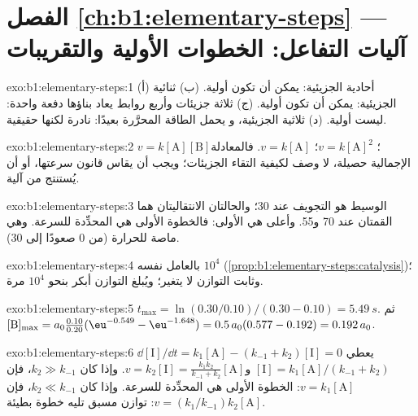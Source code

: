 \section*{الفصل \ref{ch:b1:elementary-steps} --- آليات التفاعل: الخطوات الأولية والتقريبات}

\begin{solution}{exo:b1:elementary-steps:1}
(أ) أحادية الجزيئية: يمكن أن تكون أولية. (ب) ثنائية الجزيئية: يمكن أن تكون أولية.
(ج) ثلاثة جزيئات وأربع روابط يعاد بناؤها دفعة واحدة: ليست أولية.
(د) ثلاثية الجزيئية، و يحمل الطاقة المحرَّرة بعيدًا: 
نادرة لكنها حقيقية.
\end{solution}

\begin{solution}{exo:b1:elementary-steps:2}
$v = k[\mathrm{A}][\mathrm{B}]$؛ $v = k[\mathrm{A}]^2$؛ $v = k[\mathrm{A}]$.
فالمعادلة الإجمالية حصيلة، لا وصف لكيفية التقاء
الجزيئات؛ ويجب أن يقاس قانون سرعتها، أو أن يُستنتج من
آلية.
\end{solution}

\begin{solution}{exo:b1:elementary-steps:3}
الوسيط هو التجويف عند 30؛ والحالتان الانتقاليتان هما
القمتان عند 70 و55. وأعلى  هي الأولى: فالخطوة
الأولى هي المحدِّدة للسرعة. وهي ماصة للحرارة (من 0 صعودًا إلى 30).
\end{solution}

\begin{solution}{exo:b1:elementary-steps:4}
بالعامل نفسه $10^4$ (\cref{prop:b1:elementary-steps:catalysis})؛
وثابت التوازن لا يتغير؛ ويُبلغ التوازن أبكر بنحو $10^4$
مرة.
\end{solution}

\begin{solution}{exo:b1:elementary-steps:5}
$t_{\max} = \ln(0.30/0.10)/(0.30 - 0.10) = \qty{5.49}{s}$. ثم
$[\mathrm{B}]_{\max} = a_0\frac{0.10}{0.20}(\eu^{-0.549} - \eu^{-1.648}) =
0.5\,a_0(0.577 - 0.192) = 0.192\,a_0$.
\end{solution}

\begin{solution}{exo:b1:elementary-steps:6}
$\dd[\mathrm{I}]/\dd t = k_1[\mathrm{A}] - (k_{-1} + k_2)[\mathrm{I}] = 0$
يعطي $[\mathrm{I}] = k_1[\mathrm{A}]/(k_{-1} + k_2)$ و$v = k_2[\mathrm{I}]
= \frac{k_1k_2}{k_{-1}+k_2}[\mathrm{A}]$. وإذا كان $k_2 \gg k_{-1}$، فإن $v =
k_1[\mathrm{A}]$: الخطوة الأولى هي المحدِّدة للسرعة. وإذا كان $k_2 \ll k_{-1}$،
فإن $v = (k_1/k_{-1})k_2[\mathrm{A}]$: توازن مسبق تليه خطوة
بطيئة.
\end{solution}

